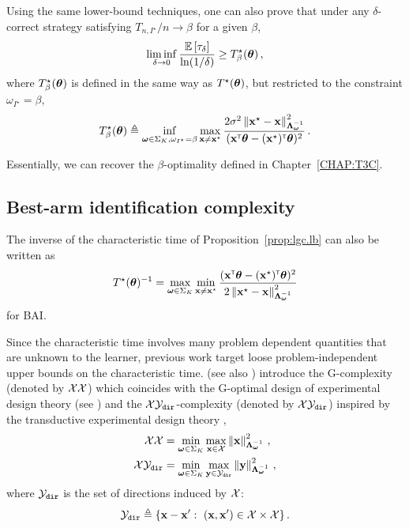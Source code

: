 \begin{remark}
\begin{leftbar}[remarkbar]
Using the same lower-bound techniques, one can also prove that under any $\delta$-correct strategy satisfying $T_{n,I^\star}/n \rightarrow \beta$ for a given $\beta$,
\[
    \liminf_{\delta \rightarrow 0}\frac{\mathbb{E}\left[\tau_\delta\right]}{\ln(1/\delta)} \geq T^\star_\beta({\boldsymbol \theta})\,,
\]
where $T^\star_\beta({\boldsymbol \theta})$ is defined in the same way as $T^\star({\boldsymbol \theta})$, but restricted to the constraint $\omega_{I^\star}=\beta$,
\[
    T^\star_{\beta}({\boldsymbol \theta}) \triangleq \inf_{{\boldsymbol \omega}\in\Sigma_K,\omega_{I^\star}=\beta}\max_{{\bf x}\neq {\bf x}^\star} \frac{2\sigma^2\left\lVert{\bf x}^\star - {\bf x}\right\rVert^2_{{\boldsymbol \Lambda}_{{\boldsymbol \omega}}^{-1}}}{({\bf x}^\mathsf{\scriptscriptstyle T}{\boldsymbol \theta}-({\bf x}^\star)^\mathsf{\scriptscriptstyle T}{\boldsymbol \theta})^2}\,.
\]


Essentially, we can recover the $\beta$-optimality defined in Chapter~\ref{CHAP:T3C}.
\end{leftbar}
\end{remark}

\subsection{Best-arm identification complexity}\label{sec:lgc.complexity.complexity}

The inverse of the characteristic time of Proposition~\ref{prop:lgc.lb} can also be written as
\[
    T^{\star}({\boldsymbol \theta})^{-1} = \max_{{\boldsymbol \omega}\in\Sigma_K} \min_{{\bf x}\neq {\bf x}^\star} \frac{({\bf x}^\mathsf{\scriptscriptstyle T}{\boldsymbol \theta}-({\bf x}^\star)^\mathsf{\scriptscriptstyle T}{\boldsymbol \theta})^2}{2\left\lVert{\bf x}^\star - {\bf x}\right\rVert^2_{{\boldsymbol \Lambda}_{{\boldsymbol \omega}}^{-1}}}
\]
for BAI.

Since the characteristic time involves many problem dependent quantities that are unknown to the learner, previous work target loose problem-independent upper bounds on the characteristic time. \citet{soare2014linear} (see also \citealt{tao2018alba,fiez2019transductive}) introduce the G-complexity (denoted by $\mathcal{X}\mathcal{X}$) which coincides with the G-optimal design of experimental design theory (see \citealt{pukelsheim2006optimal}) and the $\mathcal{X}\mathcal{Y}_{\texttt{dir}}$-complexity (denoted by $\mathcal{X}\mathcal{Y}_{\texttt{dir}}$) inspired by the transductive experimental design theory  \citep{yu2006active},
\begin{align*}
    \mathcal{X}\mathcal{X} &=\min_{{\boldsymbol \omega}\in\Sigma_K} \max_{{\bf x}\in\mathcal{X}} \left\lVert{\bf x}\right\rVert_{{\boldsymbol \Lambda}_{{\boldsymbol \omega}}^{-1}}^2\,,\\
    \mathcal{X}\mathcal{Y}_{\texttt{dir}} &=\min_{{\boldsymbol \omega}\in\Sigma_K} \max_{{\bf y}\in\mathcal{Y}_{\texttt{dir}}} \left\lVert{\bf y}\right\rVert_{{\boldsymbol \Lambda}_{{\boldsymbol \omega}}^{-1}}^2\,,
\end{align*}
where $\mathcal{Y}_{\texttt{dir}}$ is the set of directions induced by $\mathcal{X}$:
\[
\cY_{\texttt{dir}}\eqdef\{\bx-\bx':\ (\bx,\bx')\in\cX\times\cX\}\,.
\]

